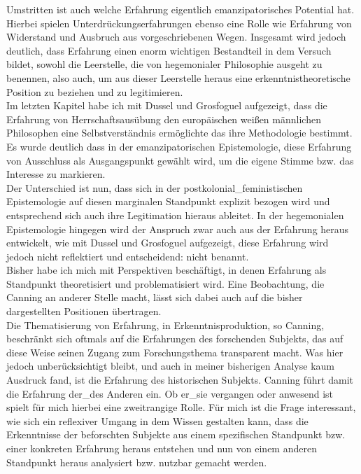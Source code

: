 Umstritten ist auch welche Erfahrung eigentlich emanzipatorisches Potential
hat. Hierbei spielen Unterdrückungserfahrungen ebenso eine Rolle wie Erfahrung
von Widerstand und Ausbruch aus vorgeschriebenen Wegen. Insgesamt wird jedoch
deutlich, dass Erfahrung einen enorm wichtigen Bestandteil in dem Versuch
bildet, sowohl die Leerstelle, die von hegemonialer Philosophie ausgeht zu
benennen, also auch, um aus dieser Leerstelle heraus eine
erkenntnistheoretische Position zu beziehen und zu legitimieren.
\\

Im letzten Kapitel habe ich mit Dussel und Grosfoguel aufgezeigt, dass die
Erfahrung von Herrschaftsausübung den europäischen weißen männlichen
Philosophen eine Selbstverständnis ermöglichte das ihre Methodologie bestimmt.
Es wurde deutlich dass in der emanzipatorischen Epistemologie, diese Erfahrung
von Ausschluss als Ausgangspunkt gewählt wird, um die eigene Stimme bzw. das
Interesse zu markieren. \\
Der Unterschied ist nun, dass sich in der
postkolonial\_feministischen Epistemologie auf diesen marginalen Standpunkt
explizit bezogen wird und entsprechend sich auch ihre Legitimation hieraus
ableitet. In der hegemonialen Epistemologie hingegen wird der Anspruch zwar
auch aus der Erfahrung heraus entwickelt, wie mit Dussel und Grosfoguel
aufgezeigt, diese Erfahrung wird jedoch nicht reflektiert und entscheidend:
nicht benannt.
\\
           
Bisher habe ich mich mit Perspektiven beschäftigt, in denen Erfahrung als
Standpunkt theoretisiert und problematisiert wird. Eine Beobachtung, die
Canning an anderer Stelle\footnotemark {} macht, lässt sich dabei auch
auf die bisher dargestellten Positionen übertragen.\\
 Die Thematisierung von
Erfahrung, in Erkenntnisproduktion, so Canning, beschränkt sich oftmals auf
die Erfahrungen des forschenden Subjekts, das auf diese Weise seinen Zugang zum
Forschungsthema transparent macht. Was hier jedoch unberücksichtigt bleibt, und
auch in meiner bisherigen Analyse kaum Ausdruck fand, ist die Erfahrung des
historischen Subjekts. Canning führt damit die Erfahrung der\_des Anderen ein.
Ob er\_sie vergangen oder anwesend ist spielt für mich hierbei eine zweitrangige
Rolle. Für mich ist die Frage interessant, wie sich ein reflexiver Umgang in
dem Wissen gestalten kann, dass die Erkenntnisse der beforschten Subjekte aus
einem spezifischen Standpunkt bzw. einer konkreten Erfahrung heraus entstehen
und nun von einem anderen Standpunkt heraus analysiert bzw. nutzbar gemacht
werden.          
\\


